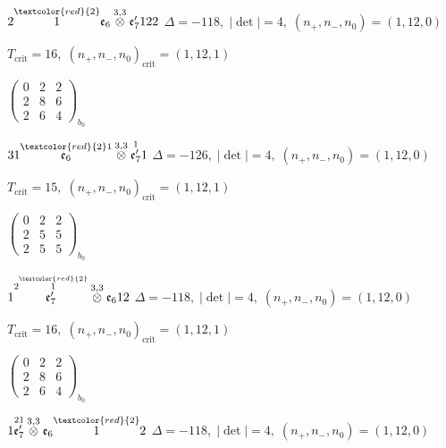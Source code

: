 \documentclass[10pt]{article}
\begin{document}
\smallskip

$2\overset{\textcolor{red}{2}}{1}\mathfrak{e}_6\overset{3,3}{\otimes}\mathfrak{e}_7'122$ \quad $\Delta=-118,\; |\det|=4,\; (n_+,n_-,n_0)=(1,12,0)$

\hspace{1em}$T_{\text{crit}}=16,\; (n_+,n_-,n_0)_{\text{crit}}=(1,12,1)$

\hspace{2em}$\left(\begin{smallmatrix}0 & 2 & 2 \\ 2 & 8 & 6 \\ 2 & 6 & 4\end{smallmatrix}\right)_{\!b_0}$

\smallskip

$31\overset{\textcolor{red}{2}1}{\mathfrak{e}_6}\overset{3,3}{\otimes}\overset{1}{\mathfrak{e}_7'}1$ \quad $\Delta=-126,\; |\det|=4,\; (n_+,n_-,n_0)=(1,12,0)$

\hspace{1em}$T_{\text{crit}}=15,\; (n_+,n_-,n_0)_{\text{crit}}=(1,12,1)$

\hspace{2em}$\left(\begin{smallmatrix}0 & 2 & 2 \\ 2 & 5 & 5 \\ 2 & 5 & 5\end{smallmatrix}\right)_{\!b_0}$

\smallskip

$1\overset{2\overset{\textcolor{red}{2}}{1}}{\mathfrak{e}_7'}\overset{3,3}{\otimes}\mathfrak{e}_612$ \quad $\Delta=-118,\; |\det|=4,\; (n_+,n_-,n_0)=(1,12,0)$

\hspace{1em}$T_{\text{crit}}=16,\; (n_+,n_-,n_0)_{\text{crit}}=(1,12,1)$

\hspace{2em}$\left(\begin{smallmatrix}0 & 2 & 2 \\ 2 & 8 & 6 \\ 2 & 6 & 4\end{smallmatrix}\right)_{\!b_0}$

$1\overset{21}{\mathfrak{e}_7'}\overset{3,3}{\otimes}\mathfrak{e}_6\overset{\textcolor{red}{2}}{1}2$ \quad $\Delta=-118,\; |\det|=4,\; (n_+,n_-,n_0)=(1,12,0)$
\end{document}
